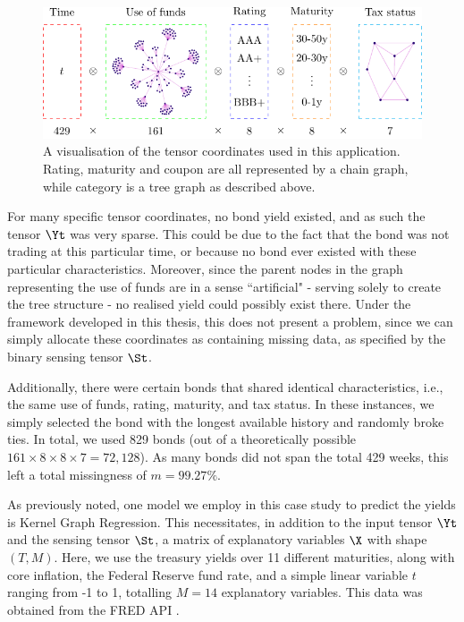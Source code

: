 \begin{figure}[t] 
    \begin{center}
        \includegraphics[width=0.9\linewidth]{Figures/bond_tensor.pdf}
    \end{center}
   \caption[A visualisation of the tensor coordinates used in the greed bond application]{A visualisation of the tensor coordinates used in this application. Rating, maturity and coupon are all represented by a chain graph, while category is a tree graph as described above.} 
    \label{fig:bond_tensor}
\end{figure} 

For many specific tensor coordinates, no bond yield existed, and as such the tensor $\Yt$ was very sparse. This could be due to the fact that the bond was not trading at this particular time, or because no bond ever existed with these particular characteristics. Moreover, since the parent nodes in the graph representing the use of funds are in a sense ``artificial" - serving solely to create the tree structure - no realised yield could possibly exist there. Under the framework developed in this thesis, this does not present a problem, since we can simply allocate these coordinates as containing missing data, as specified by the binary sensing tensor $\St$. 

Additionally, there were certain bonds that shared identical characteristics, i.e., the same use of funds, rating, maturity, and tax status. In these instances, we simply selected the bond with the longest available history and randomly broke ties. In total, we used 829 bonds (out of a theoretically possible $161 \times 8 \times 8 \times 7 = 72,128$). As many bonds did not span the total 429 weeks, this left a total missingness of $m=99.27\%$.

As previously noted, one model we employ in this case study to predict the yields is Kernel Graph Regression. This necessitates, in addition to the input tensor $\Yt$ and the sensing tensor $\St$, a matrix of explanatory variables $\X$ with shape $(T, M)$. Here, we use the treasury yields over 11 different maturities, along with core inflation, the Federal Reserve fund rate, and a simple linear variable $t$ ranging from -1 to 1, totalling $M=14$ explanatory variables. This data was obtained from the FRED API \citep{FRED2023}.


